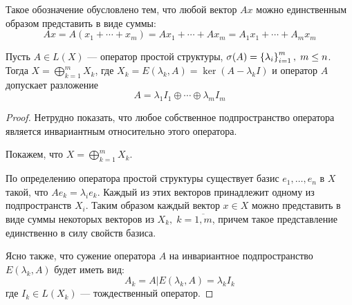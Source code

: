 Такое обозначение обусловлено тем, что любой вектор $Ax$ можно единственным образом
представить в виде суммы:
\[ Ax = A(x_1 + \dotsb + x_m) = Ax_1 + \dotsb + Ax_m = A_1 x_1 + \dotsb + A_m
    x_m \]

\begin{theorem} \label{th:diagonexpansion}
    Пусть $A \in L(X)$ — оператор простой структуры, $\operatorname{\sigma}(A) = \left\{\lambda_i\right\}_{i=1}^m, \; 
    m \le n$. Тогда $X = \bigoplus\limits_{k=1}^m X_k$, где $X_k =
    E(\lambda_k, A) = \ker (A-\lambda_k I)$ и оператор $A$ допускает разложение
    \[ A = \lambda_1 I_1 \oplus \dotsb \oplus \lambda_m I_m \]
\end{theorem}

\begin{proof}
    Нетрудно показать, что любое собственное подпространство оператора является
    инвариантным относительно этого оператора. 
    
    Покажем, что $ X = \bigoplus\limits_{k=1}^m X_k$. 
    
    По определению оператора простой структуры
    существует базис $e_1, \dotsc, e_n$ в $X$ такой, что $Ae_k = \lambda_{i}
    e_k$. Каждый из этих векторов принадлежит одному из подпространств $X_i$.
    Таким образом каждый вектор $x\in X$ можно представить в виде суммы
    некоторых векторов из $X_k,\; k = \overline{1,m}$, причем такое
    представление единственно в силу свойств базиса.

    Ясно также, что сужение оператора $A$ на инвариантное подпространство
    $E(\lambda_k, A)$ будет иметь вид:
    \[ A_k = A | E(\lambda_k, A) = \lambda_k I_k \]
    где $I_k \in L(X_k)$ — тождественный оператор.
\end{proof}

